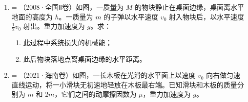 \documentclass[\gkver]{gaokaozhenti}
\makeatletter
\newcommand{\tiinfo}[2]{{\small\color{gray}（#1）\textcolor{orange!85!black}{\nandu{#2}}}\hspace{0.4em}}
\newenvironment{tibody}
  {\begin{minipage}[t]{\linewidth}\@listdepth=\@ne\leavevmode\ignorespaces}
  {\end{minipage}}
\makeatother
\begin{document}
\begin{enumerate}[resume=tiku]
{	对于 B 选项，由 $\Delta E = \frac{mMv^{2}}{2(m + M)} = \frac{Mv^{2}}{2\left(\frac{M}{m} + 1\right)}$ 可知若保持 $M$、$v$、$l$ 不变，$m$ 变大则系统损失的机械能变大，故 B 错误；

	对于 C 选项，由 $\Delta E = \frac{mMv^{2}}{2(m + M)}$ 可知若保持 $M$、$m$、$l$ 不变，$v$ 变大则系统损失的机械能变大，故 C 正确；

	对于 D 选项，子弹与沙箱共同向上摆动一小角度的过程系统机械能守恒，故 D 错误。
}

\item
\begin{tibody}
\tiinfo{2008·全国Ⅱ卷}{2}如图，一质量为 $M$ 的物块静止在桌面边缘，桌面离水平地面的高度为 $h$。一质量为 $m$ 的子弹以水平速度 $v_{0}$ 射入物块后，以水平速度 $\frac{1}{2}v_{0}$ 射出。重力加速度为 $g$。求：

\begin{enumerate}
	\item
	此过程中系统损失的机械能；
	\item
	此后物块落地点离桌面边缘的水平距离。
\end{enumerate}

\end{tibody}



\item
\begin{tibody}
\tiinfo{2021·海南卷}{3}如图，一长木板在光滑的水平面上以速度 $v_{0}$ 向右做匀速直线运动，将一小滑块无初速地轻放在木板最右端。已知滑块和木板的质量分别为 $m$ 和 $2m$，它们之间的动摩擦因数为 $\mu$，重力加速度为 $g$。


\end{tibody}
\end{enumerate}
\end{document}
